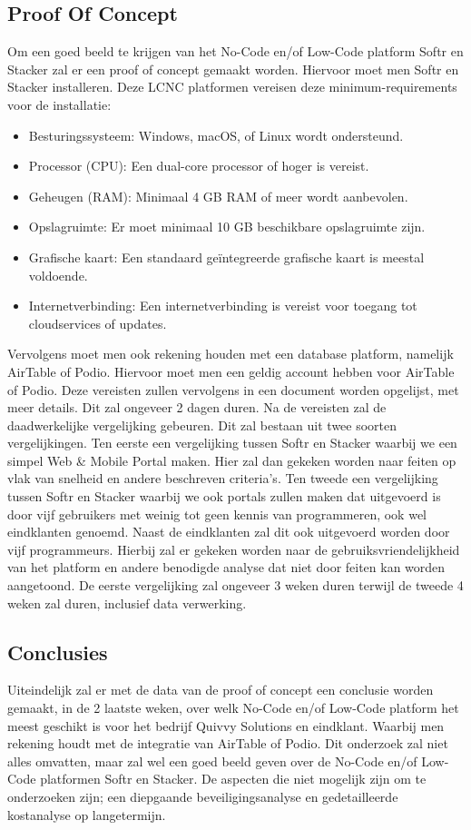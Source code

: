 \subsection*{Proof Of Concept}
\label{sub:proof-of-concept}
Om een goed beeld te krijgen van het No-Code en/of Low-Code platform Softr en Stacker zal er een proof of concept gemaakt worden.
Hiervoor moet men Softr en Stacker installeren. 
Deze LCNC platformen vereisen deze minimum-requirements voor de installatie:
\begin{itemize}
  \item Besturingssysteem: Windows, macOS, of Linux wordt ondersteund.
  \item Processor (CPU): Een dual-core processor of hoger is vereist.
  \item Geheugen (RAM): Minimaal 4 GB RAM of meer wordt aanbevolen.
  \item Opslagruimte: Er moet minimaal 10 GB beschikbare opslagruimte zijn.
  \item Grafische kaart: Een standaard geïntegreerde grafische kaart is meestal voldoende.
  \item Internetverbinding: Een internetverbinding is vereist voor toegang tot cloudservices of updates. 
\end{itemize}
Vervolgens moet men ook rekening houden met een database platform, namelijk AirTable of Podio.
Hiervoor moet men een geldig account hebben voor AirTable of Podio. Deze vereisten zullen vervolgens in een 
document worden opgelijst, met meer details. Dit zal ongeveer 2 dagen duren.
Na de vereisten zal de daadwerkelijke vergelijking gebeuren. Dit zal bestaan uit twee soorten vergelijkingen. Ten eerste
een vergelijking tussen Softr en Stacker waarbij we een simpel Web \& Mobile Portal maken. Hier zal dan gekeken worden naar feiten op vlak van snelheid en andere beschreven criteria's.
Ten tweede een vergelijking tussen Softr en Stacker waarbij we ook portals zullen maken dat uitgevoerd is door vijf gebruikers met weinig tot geen kennis van programmeren, ook wel eindklanten genoemd.
Naast de eindklanten zal dit ook uitgevoerd worden door vijf programmeurs. Hierbij zal er gekeken worden naar de gebruiksvriendelijkheid van het platform en andere benodigde analyse dat niet door feiten kan worden aangetoond.
De eerste vergelijking zal ongeveer 3 weken duren terwijl de tweede 4 weken zal duren, inclusief data verwerking.

\subsection*{Conclusies}
\label{sub:conclusies}
Uiteindelijk zal er met de data van de proof of concept een conclusie worden gemaakt, in de 2 laatste weken, over welk No-Code en/of Low-Code platform het meest geschikt is voor het bedrijf Quivvy Solutions en eindklant. 
Waarbij men rekening houdt met de integratie van AirTable of Podio. Dit onderzoek zal niet alles omvatten, maar zal wel een goed beeld geven over de No-Code en/of Low-Code platformen Softr en Stacker.
De aspecten die niet mogelijk zijn om te onderzoeken zijn; een diepgaande beveiligingsanalyse
en gedetailleerde kostanalyse op langetermijn.


